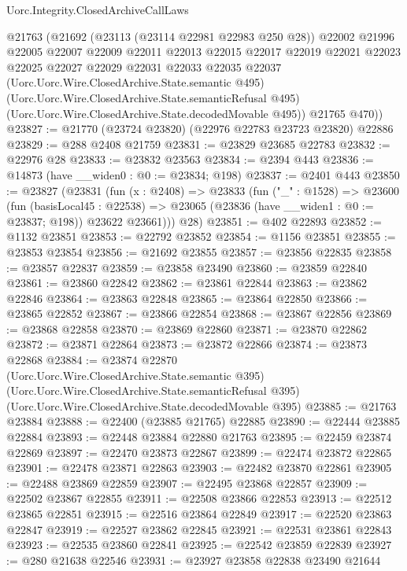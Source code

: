 \begin{lexlean}{Uorc.Integrity.ClosedArchiveCallLaws}
\begin{coremodule}
      @21763
        (@21692
          (@23113 (@23114 @22981 @22983 @250 @28))
          @22002
          @21996
          @22005
          @22007
          @22009
          @22011
          @22013
          @22015
          @22017
          @22019
          @22021
          @22023
          @22025
          @22027
          @22029
          @22031
          @22033
          @22035
          @22037
          (Uorc.Uorc.Wire.ClosedArchive.State.semantic @495)
          (Uorc.Uorc.Wire.ClosedArchive.State.semanticRefusal @495)
          (Uorc.Uorc.Wire.ClosedArchive.State.decodedMovable @495))
        @21765
        @470))
@23827 := @21770 (@23724 @23820) (@22976 @22783 @23723 @23820) @22886
@23829 := @288 @2408 @21759
@23831 := @23829 @23685 @22783
@23832 := @22976 @28
@23833 := @23832 @23563
@23834 := @2394 @443
@23836 := @14873 (have __widen0 : @0 := @23834; @198)
@23837 := @2401 @443
@23850 := @23827
    (@23831
      (fun (x : @2408) =>
      @23833
        (fun ("_" : @1528) =>
        @23600
          (fun (basisLocal45 : @22538) =>
          @23065 (@23836 (have __widen1 : @0 := @23837; @198)) @23622 @23661)))
      @28)
@23851 := @402 @22893
@23852 := @1132 @23851
@23853 := @22792 @23852
@23854 := @1156 @23851
@23855 := @23853 @23854
@23856 := @21692 @23855
@23857 := @23856 @22835
@23858 := @23857 @22837
@23859 := @23858 @23490
@23860 := @23859 @22840
@23861 := @23860 @22842
@23862 := @23861 @22844
@23863 := @23862 @22846
@23864 := @23863 @22848
@23865 := @23864 @22850
@23866 := @23865 @22852
@23867 := @23866 @22854
@23868 := @23867 @22856
@23869 := @23868 @22858
@23870 := @23869 @22860
@23871 := @23870 @22862
@23872 := @23871 @22864
@23873 := @23872 @22866
@23874 := @23873 @22868
@23884 := @23874
    @22870
    (Uorc.Uorc.Wire.ClosedArchive.State.semantic @395)
    (Uorc.Uorc.Wire.ClosedArchive.State.semanticRefusal @395)
    (Uorc.Uorc.Wire.ClosedArchive.State.decodedMovable @395)
@23885 := @21763 @23884
@23888 := @22400 (@23885 @21765) @22885
@23890 := @22444 @23885 @22884
@23893 := @22448 @23884 @22880 @21763
@23895 := @22459 @23874 @22869
@23897 := @22470 @23873 @22867
@23899 := @22474 @23872 @22865
@23901 := @22478 @23871 @22863
@23903 := @22482 @23870 @22861
@23905 := @22488 @23869 @22859
@23907 := @22495 @23868 @22857
@23909 := @22502 @23867 @22855
@23911 := @22508 @23866 @22853
@23913 := @22512 @23865 @22851
@23915 := @22516 @23864 @22849
@23917 := @22520 @23863 @22847
@23919 := @22527 @23862 @22845
@23921 := @22531 @23861 @22843
@23923 := @22535 @23860 @22841
@23925 := @22542 @23859 @22839
@23927 := @280 @21638 @22546
@23931 := @23927 @23858 @22838 @23490 @21644

\end{coremodule}
\end{lexlean}
